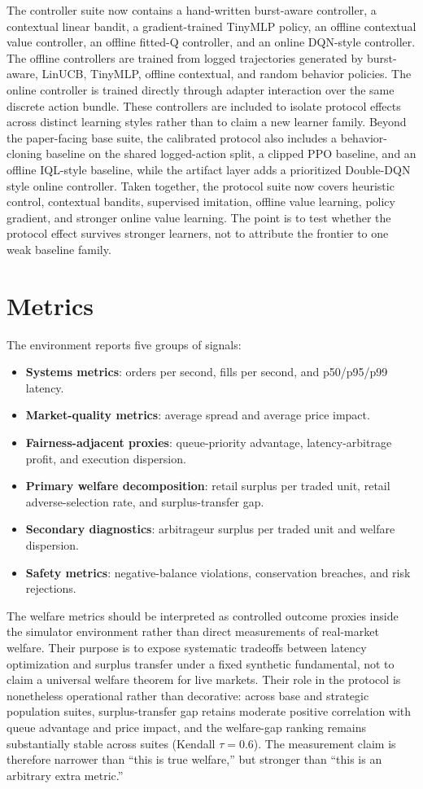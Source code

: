 \documentclass[11pt]{article}
\begin{document}
The controller suite now contains a hand-written burst-aware controller, a contextual linear bandit, a gradient-trained TinyMLP policy, an offline contextual value controller, an offline fitted-Q controller, and an online DQN-style controller. The offline controllers are trained from logged trajectories generated by burst-aware, LinUCB, TinyMLP, offline contextual, and random behavior policies. The online controller is trained directly through adapter interaction over the same discrete action bundle. These controllers are included to isolate protocol effects across distinct learning styles rather than to claim a new learner family. Beyond the paper-facing base suite, the calibrated protocol also includes a behavior-cloning baseline on the shared logged-action split, a clipped PPO baseline, and an offline IQL-style baseline, while the artifact layer adds a prioritized Double-DQN style online controller. Taken together, the protocol suite now covers heuristic control, contextual bandits, supervised imitation, offline value learning, policy gradient, and stronger online value learning. The point is to test whether the protocol effect survives stronger learners, not to attribute the frontier to one weak baseline family.

\section{Metrics}
The environment reports five groups of signals:
\begin{itemize}[leftmargin=*]
  \item \textbf{Systems metrics}: orders per second, fills per second, and p50/p95/p99 latency.
  \item \textbf{Market-quality metrics}: average spread and average price impact.
  \item \textbf{Fairness-adjacent proxies}: queue-priority advantage, latency-arbitrage profit, and execution dispersion.
  \item \textbf{Primary welfare decomposition}: retail surplus per traded unit, retail adverse-selection rate, and surplus-transfer gap.
  \item \textbf{Secondary diagnostics}: arbitrageur surplus per traded unit and welfare dispersion.
  \item \textbf{Safety metrics}: negative-balance violations, conservation breaches, and risk rejections.
\end{itemize}
The welfare metrics should be interpreted as controlled outcome proxies inside the simulator environment rather than direct measurements of real-market welfare. Their purpose is to expose systematic tradeoffs between latency optimization and surplus transfer under a fixed synthetic fundamental, not to claim a universal welfare theorem for live markets. Their role in the protocol is nonetheless operational rather than decorative: across base and strategic population suites, surplus-transfer gap retains moderate positive correlation with queue advantage and price impact, and the welfare-gap ranking remains substantially stable across suites (Kendall $\tau = 0.6$). The measurement claim is therefore narrower than ``this is true welfare,'' but stronger than ``this is an arbitrary extra metric.''
\end{document}

